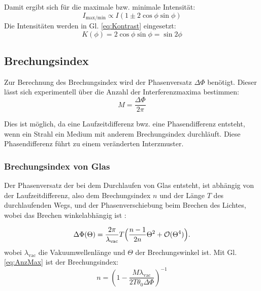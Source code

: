 Damit ergibt sich für die maximale bzw. minimale Intensität:
\begin{equation}
  I_{\text{max/min}} \propto I(1\pm 2\cos{\phi}\sin{\phi})
  \label{eq:imaxmin}
\end{equation}
\noindent Die Intensitäten werden in Gl. \eqref{eq:Kontrast} eingesetzt:
\begin{equation}
  \label{eqn:K}
  K(\phi)=2\cos{\phi}\sin{\phi}=\sin{2\phi}
\end{equation}

\subsection{Brechungsindex}%
Zur Berechnung des Brechungsindex wird der Phasenversatz $\Delta \Phi$ benötigt.
Dieser lässt sich experimentell über die Anzahl der Interferenzmaxima bestimmen:
\begin{equation}
  M=\frac{\Delta \Phi}{2\pi}
  \label{eq:AnzMax}
\end{equation}

Dies ist möglich, 
da eine Laufzeitdifferenz bwz. eine Phasendifferenz entsteht,
wenn ein Strahl ein Medium mit anderem Brechungsindex durchläuft.
Diese Phasendifferenz führt zu einem veränderten Interzmuster.

\subsubsection{Brechungsindex von Glas}%
Der Phasenversatz der bei dem Durchlaufen von Glas entsteht,
ist abhängig von der Laufzeitdifferenz, 
also dem Brechungsindex $n$ und der Länge $T$ des durchlaufenden Wegs,
und der Phasenverschiebung beim Brechen des Lichtes,
wobei das Brechen winkelabhängig ist \cite{V64}:

\begin{equation}
\Delta \Phi
(\Theta)=\frac{2\pi}{\lambda_{\text{vac}}}T\Bigl(\frac{n-1}{2n}\Theta^2+\mathcal{O}(\Theta^4)   \Bigr) .
\label{eq:nGlas}
\end{equation}
\noindent wobei $\lambda_{\text{vac}}$ die Vakuumwellenlänge 
und $\Theta$ der Brechungswinkel ist.
Mit Gl. \eqref{eq:AnzMax} ist der Brechungsindex:
\begin{equation}
  n = \left(1 - \frac{M \lambda_{\text{vac}}}{2 T \theta_0 \Delta\Phi}\right)^{-1} 
  \label{eq:n_glas}
\end{equation}

